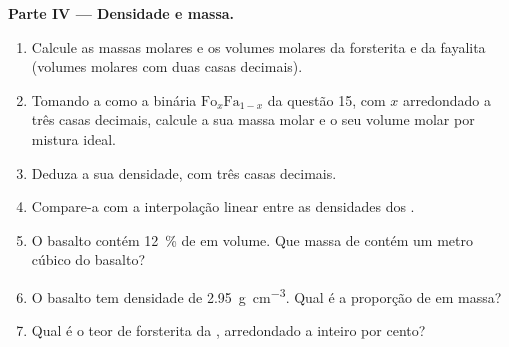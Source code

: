 \begin{problem}
\medskip
\noindent\textbf{Parte IV --- Densidade e massa.}
\begin{enumerate}[resume]
  \item Calcule as massas molares e os volumes molares da forsterita e da
        fayalita (volumes molares com duas casas decimais).
  \item Tomando a  como a binária $\mathrm{Fo}_x\mathrm{Fa}_{1-x}$ da questão 15, com $x$ arredondado a três casas decimais, calcule a sua massa molar e o seu volume molar por mistura ideal.
  \item Deduza a sua densidade, com três casas decimais.
  \item Compare-a com a interpolação linear entre as densidades dos .
  \item O basalto contém \qty{12}{\percent} de  em volume. Que massa de  contém um metro cúbico do basalto?
  \item O basalto tem densidade de \qty{2.95}{g.cm^{-3}}. Qual é a proporção de  em massa?
  \item Qual é o teor de forsterita da , arredondado a inteiro por cento?
\end{enumerate}
\end{problem}
